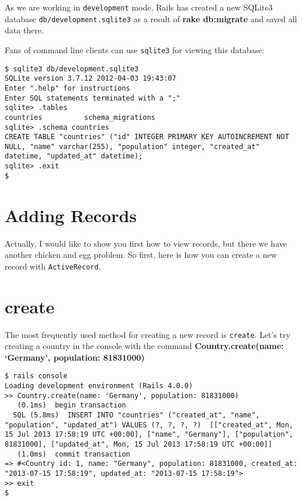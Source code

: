 \documentclass[a4paper]{book}
\newcounter{tab}[chapter]
\begin{document}
As we are working in \texttt{development} mode, Rails has created a new SQLite3 database \texttt{db/development.sqlite3} as a result of \textbf{rake db:migrate} and saved all data there.

Fans of command line clients can use \texttt{sqlite3} for viewing this database:

\begin{shaded}\begin{verbatim}
$ sqlite3 db/development.sqlite3
SQLite version 3.7.12 2012-04-03 19:43:07
Enter ".help" for instructions
Enter SQL statements terminated with a ";"
sqlite> .tables
countries          schema_migrations
sqlite> .schema countries
CREATE TABLE "countries" ("id" INTEGER PRIMARY KEY AUTOINCREMENT NOT NULL, "name" varchar(255), "population" integer, "created_at" datetime, "updated_at" datetime);
sqlite> .exit
$
\end{verbatim}\end{shaded}

\section{Adding Records}\label{adding-records}

Actually, I would like to show you first how to view records, but there we have another chicken and egg problem. So first, here is how you can create a new record with \texttt{ActiveRecord}.

\section{create}\label{create}

The most frequently used method for creating a new record is \texttt{create}. Let's try creating a country in the console with the command \textbf{Country.create(name: `Germany', population: 81831000)}

\begin{shaded}\begin{verbatim}
$ rails console
Loading development environment (Rails 4.0.0)
>> Country.create(name: 'Germany', population: 81831000)
   (0.1ms)  begin transaction
  SQL (5.8ms)  INSERT INTO "countries" ("created_at", "name", "population", "updated_at") VALUES (?, ?, ?, ?)  [["created_at", Mon, 15 Jul 2013 17:58:19 UTC +00:00], ["name", "Germany"], ["population", 81831000], ["updated_at", Mon, 15 Jul 2013 17:58:19 UTC +00:00]]
   (1.0ms)  commit transaction
=> #<Country id: 1, name: "Germany", population: 81831000, created_at: "2013-07-15 17:58:19", updated_at: "2013-07-15 17:58:19">
>> exit
$
\end{verbatim}\end{shaded}
\end{document}
